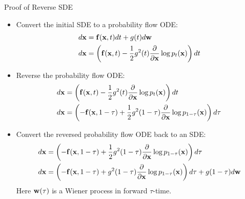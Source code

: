 \documentclass{beamer}
\renewcommand{\eqpause}{}
\begin{document}
\begin{frame}{Proof of Reverse SDE}
	\vspace{-0.3cm}
	\begin{itemize}
			\item Convert the initial SDE to a probability flow ODE:
			\vspace{-0.1cm}
			{\footnotesize
			\begin{align*}
				d\mathbf{x} &= \mathbf{f}(\mathbf{x}, t) dt + g(t) d \mathbf{w} \\
				d\mathbf{x} &= \left(\mathbf{f}(\mathbf{x}, t) -\frac{1}{2} g^2(t) \frac{\partial}{\partial \mathbf{x}} \log p_t(\mathbf{x}) \right) dt
			\end{align*}
			}
			\vspace{-0.5cm}
			\eqpause
			\item Reverse the probability flow ODE:
			\vspace{-0.1cm}
			{\footnotesize
			\begin{align*}
				d\mathbf{x} &= \left(\mathbf{f}(\mathbf{x}, t) -\frac{1}{2} g^2(t) \frac{\partial}{\partial \mathbf{x}} \log p_t(\mathbf{x}) \right) dt \\
				d\mathbf{x} &= \left(-\mathbf{f}(\mathbf{x}, 1 - \tau) + \frac{1}{2} g^2(1 - \tau) \frac{\partial}{\partial \mathbf{x}} \log p_{1 - \tau}(\mathbf{x}) \right) d\tau
			\end{align*}
			}
			\vspace{-0.5cm}
			\eqpause
			\item Convert the reversed probability flow ODE back to an SDE:
			\vspace{-0.1cm}
			{\footnotesize
			\begin{align*}
				d\mathbf{x} &= \left(-\mathbf{f}(\mathbf{x}, 1 - \tau) + \frac{1}{2} g^2(1 - \tau) \frac{\partial}{\partial \mathbf{x}} \log p_{1 - \tau}(\mathbf{x}) \right) d \tau \\
				d\mathbf{x} &= \left(-\mathbf{f}(\mathbf{x}, 1 - \tau) + g^2(1 - \tau) \frac{\partial}{\partial \mathbf{x}} \log p_{1 - \tau}(\mathbf{x}) \right) d \tau + g(1-\tau)d\mathbf{w}
			\end{align*}
			}
			Here $\mathbf{w}(\tau)$ is a Wiener process in forward $\tau$-time.
		\end{itemize}
\end{frame}
\end{document}
